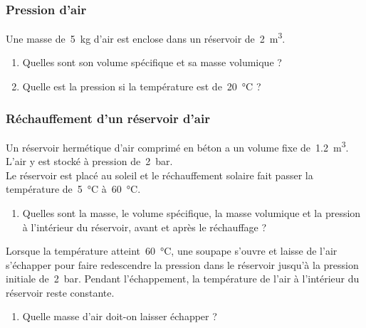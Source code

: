 \begin{boiboiboite}
	\propair
	\isentropiques
	\isothermes
\end{boiboiboite}


\subsubsection{Pression d’air}
\label{exo_pression_air}

	Une masse de~\SI{5}{\kilogram} d’air est enclose dans un réservoir de~\SI{2}{\metre\cubed}. 

	\begin{enumerate}
		\item Quelles sont son volume spécifique et sa masse volumique ?
		\item Quelle est la pression si la température est de~\SI{20}{\degreeCelsius} ?
	\end{enumerate}
	
\subsubsection{Réchauffement d’un réservoir d’air}
\label{exo_rechauffement_reservoir_air}

	Un réservoir hermétique d’air comprimé en béton a un volume fixe de~\SI{1,2}{\metre\cubed}. L’air y est stocké à pression de~\SI{2}{\bar}. \\
	Le réservoir est placé au soleil et le réchauffement solaire fait passer la température de~\SI{5}{\degreeCelsius} à~\SI{60}{\degreeCelsius}.
	
	\begin{enumerate}
		\item Quelles sont la masse, le volume spécifique, la masse volumique et la pression à l’intérieur du réservoir, avant et après le réchauffage ?
	\end{enumerate}

	Lorsque la température atteint~\SI{60}{\degreeCelsius}, une soupape s’ouvre et laisse de l’air s’échapper pour faire redescendre la pression dans le réservoir jusqu’à la pression initiale de~\SI{2}{\bar}. Pendant l’échappement, la température de l’air à l’intérieur du réservoir reste constante.

	\begin{enumerate}
		\item Quelle masse d’air doit-on laisser échapper ?
	\end{enumerate}

